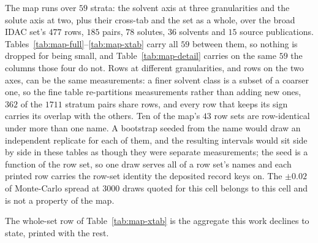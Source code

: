 The map runs over $59$ strata: the solvent axis at three granularities and the solute axis at two,
plus their cross-tab and the set as a whole, over the broad IDAC set's $477$ rows, $185$ pairs,
$78$ solutes, $36$ solvents and $15$ source publications. Tables~\ref{tab:map-full}--\ref{tab:map-xtab}
carry all $59$ between them, so nothing is dropped for being small, and
Table~\ref{tab:map-detail} carries on the same $59$ the columns those four do not. Rows at
different granularities, and rows on the two axes, can be the same measurements: a finer solvent
class is a subset of a coarser one, so the fine table re-partitions measurements rather than adding
new ones, $362$ of the $1711$ stratum pairs share rows, and every row that keeps its sign carries
its overlap with the others. Ten of the map's $43$ row sets are row-identical under more than one
name. A bootstrap seeded from the name would draw an independent replicate for each of them, and
the resulting intervals would sit side by side in these tables as though they were separate
measurements; the seed is a function of the row set, so one draw serves all of a row set's names
and each printed row carries the row-set identity the deposited record keys on. The $\pm0.02$ of Monte-Carlo
spread at $3000$ draws quoted for this cell belongs to this cell and is not a property of the map.

The whole-set row of
Table~\ref{tab:map-xtab} is the aggregate this work declines to state, printed with the rest.

